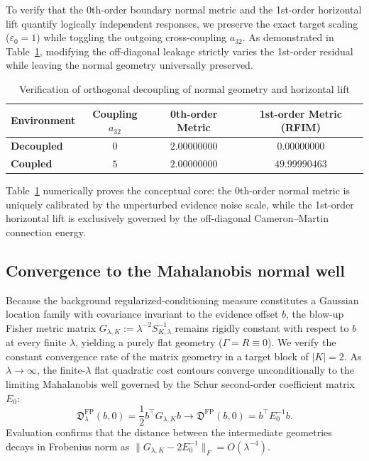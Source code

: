 To verify that the 0th-order boundary normal metric and the 1st-order horizontal lift quantify logically independent responses, we preserve the exact target scaling ($\varepsilon_0 = 1$) while toggling the outgoing cross-coupling $a_{32}$. 
As demonstrated in Table~\ref{tab:orthogonal_independence}, modifying the off-diagonal leakage strictly varies the 1st-order residual while leaving the normal geometry universally preserved.

\begin{table}[htbp]
  \centering
  \caption{Verification of orthogonal decoupling of normal geometry and horizontal lift}
  \label{tab:orthogonal_independence}
  \begin{tabular}{lccc}
    \toprule
    Environment & Coupling $a_{32}$ & 0th-order Metric & 1st-order Metric (RFIM) \\
    \midrule
    \textbf{Decoupled} & $0$ & $2.00000000$ & $0.00000000$ \\
    \textbf{Coupled}   & $5$ & $2.00000000$ & $49.99990463$ \\
    \bottomrule
  \end{tabular}
\end{table}

Table~\ref{tab:orthogonal_independence} numerically proves the conceptual core: the 0th-order normal metric is uniquely calibrated by the unperturbed evidence noise scale, while the 1st-order horizontal lift is exclusively governed by the off-diagonal Cameron--Martin connection energy.



\subsection{Convergence to the Mahalanobis normal well}
\label{sec:numerical:mahalanobis}

Because the background regularized-conditioning measure constitutes a Gaussian location family with covariance invariant to the evidence offset $b$, the blow-up Fisher metric matrix $G_{\lambda,K} := \lambda^{-2}S_{K,\lambda}^{-1}$ remains rigidly constant with respect to $b$ at every finite $\lambda$, yielding a purely flat geometry ($\Gamma = R \equiv 0$).
We verify the constant convergence rate of the matrix geometry in a target block of $|K|=2$. As $\lambda \to \infty$, the finite-$\lambda$ flat quadratic cost contours converge unconditionally to the limiting Mahalanobis well governed by the Schur second-order coefficient matrix $E_0$:
\begin{equation}
  \mathfrak{D}_\lambda^{\text{FP}}(b,0) = \frac{1}{2}b^\top G_{\lambda,K} b \longrightarrow \mathfrak{D}^{\text{FP}}(b,0) = b^\top E_0^{-1} b.
\end{equation}
Evaluation confirms that the distance between the intermediate geometries decays in Frobenius norm as $\|G_{\lambda,K} - 2E_0^{-1}\|_F = O(\lambda^{-4})$.

